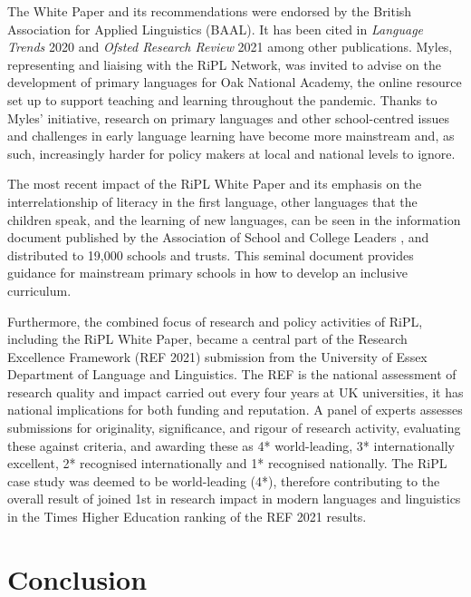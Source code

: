 \documentclass[output=paper]{langscibook}
\begin{document}
The White Paper and its recommendations were endorsed by the British Association for Applied Linguistics (BAAL). It has been cited in \textit{Language Trends} 2020 \citep{Collen2020} and \textit{Ofsted Research Review} 2021 \citep{Ofsted2021} among other publications. Myles, representing and liaising with the RiPL Network, was invited to advise on the development of primary languages for Oak National Academy, the online resource set up to support teaching and learning throughout the pandemic. Thanks to Myles’ initiative, research on primary languages and other school-centred issues and challenges in early language learning have become more mainstream and, as such, increasingly harder for policy makers at local and national levels to ignore.

The most recent impact of the RiPL White Paper and its emphasis on the interrelationship of literacy in the first language, other languages that the children speak, and the learning of new languages, can be seen in the information document published by the Association of School and College Leaders \citep{OFarrellAndersonHolmes2022}, and distributed to 19,000 schools and trusts. This seminal document provides guidance for mainstream primary schools in how to develop an inclusive curriculum. 

Furthermore, the combined focus of research and policy activities of RiPL, including the RiPL White Paper, became a central part of the Research Excellence Framework (REF 2021) submission from the University of Essex Department of Language and Linguistics. The REF is the national assessment of research quality and impact carried out every four years at UK universities, it has national implications for both funding and reputation. A panel of experts assesses submissions for originality, significance, and rigour of research activity, evaluating these against criteria, and awarding these as 4* world-leading, 3* internationally excellent, 2* recognised internationally and 1* recognised nationally. The RiPL case study was deemed to be world-leading (4*), therefore contributing to the overall result of joined 1st in research impact in modern languages and linguistics in the Times Higher Education ranking of the REF 2021 results.


\section{Conclusion}
\end{document}
